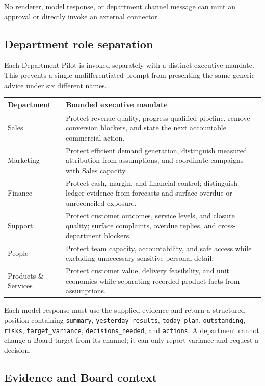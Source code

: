 No renderer, model response, or department channel message can mint an approval or directly invoke
an external connector.

\subsection{Department role separation}

Each Department Pilot is invoked separately with a distinct executive mandate.  This prevents a
single undifferentiated prompt from presenting the same generic advice under six different names.

\begin{longtable}{p{.18\linewidth}p{.76\linewidth}}
\textbf{Department} & \textbf{Bounded executive mandate}\\ \hline
Sales & Protect revenue quality, progress qualified pipeline, remove conversion blockers, and
state the next accountable commercial action.\\
Marketing & Protect efficient demand generation, distinguish measured attribution from
assumptions, and coordinate campaigns with Sales capacity.\\
Finance & Protect cash, margin, and financial control; distinguish ledger evidence from forecasts
and surface overdue or unreconciled exposure.\\
Support & Protect customer outcomes, service levels, and closure quality; surface complaints,
overdue replies, and cross-department blockers.\\
People & Protect team capacity, accountability, and safe access while excluding unnecessary
sensitive personal detail.\\
Products \& Services & Protect customer value, delivery feasibility, and unit economics while
separating recorded product facts from assumptions.\\
\end{longtable}

Each model response must use the supplied evidence and return a structured position containing
\texttt{summary}, \texttt{yesterday\_results}, \texttt{today\_plan},
\texttt{outstanding}, \texttt{risks}, \texttt{target\_variance},
\texttt{decisions\_needed}, and \texttt{actions}.  A department cannot change a Board target from
its channel; it can only report variance and request a decision.

\subsection{Evidence and Board context}

